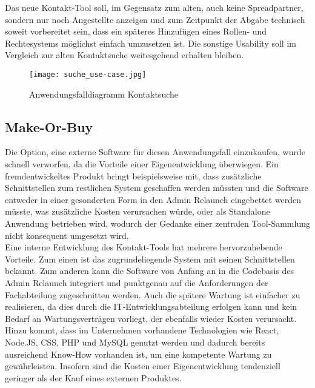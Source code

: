     \vfill
    \pagebreak

    Das neue Kontakt-Tool soll, im Gegensatz zum alten, auch keine Spreadpartner, sondern nur noch Angestellte anzeigen und zum Zeitpunkt der Abgabe technisch soweit vorbereitet sein, dass ein späteres Hinzufügen eines Rollen- und Rechtesystems möglichst einfach umzusetzen ist. Die sonstige Usability soll im Vergleich zur alten Kontaktsuche weitesgehend erhalten bleiben.

    \begin{figure}[h]
        \centering
        \texttt{[image: suche\_use-case.jpg]}
        \caption{Anwendungsfalldiagramm \glqq Kontaktsuche\grqq{}}
    \end{figure}

\subsection{Make-Or-Buy}
    Die Option, eine externe Software für diesen Anwendungsfall einzukaufen, wurde schnell verworfen, da die Vorteile einer Eigenentwicklung überwiegen. Ein fremdentwickeltes Produkt bringt beispielsweise mit, dass zusätzliche Schnittstellen zum restlichen System geschaffen werden müssten und die Software entweder in einer gesonderten Form in den Admin Relaunch eingebettet werden müsste, was zusätzliche Kosten verursachen würde, oder als Standalone Anwendung betrieben wird, wodurch der Gedanke einer zentralen Tool-Sammlung nicht konsequent umgesetzt wird.\\
    Eine interne Entwicklung des Kontakt-Tools hat mehrere hervorzuhebende Vorteile. Zum einen ist das zugrundeliegende System mit seinen Schnittstellen bekannt. Zum anderen kann die Software von Anfang an in die Codebasis des Admin Relaunch integriert und punktgenau auf die Anforderungen der Fachabteilung zugeschnitten werden. Auch die spätere Wartung ist einfacher zu realisieren, da dies durch die IT-Entwicklungsabteilung erfolgen kann und kein Bedarf an Wartungsverträgen vorliegt, der ebenfalls wieder Kosten verursacht. Hinzu kommt, dass im Unternehmen vorhandene Technologien wie React, Node.JS, CSS, PHP und MySQL genutzt werden und dadurch bereits ausreichend Know-How vorhanden ist, um eine kompetente Wartung zu gewährleisten. Insofern sind die Kosten einer Eigenentwicklung tendenziell geringer als der Kauf eines externen Produktes.\\


\vfill
\pagebreak

